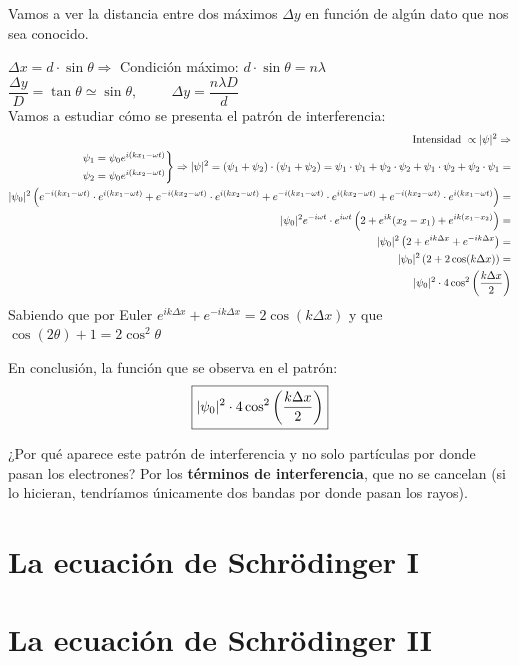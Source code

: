 \documentclass{report}
\begin{document}
    \noindent Vamos a ver la distancia entre dos máximos $\Delta y$ en función de algún dato
    que nos sea conocido.

    \noindent $\Delta x = d\cdot\sin\theta\Rightarrow$ Condición máximo: $\boxed{d\cdot\sin
    \theta=n\lambda}$ \hspace{1.5cm} $\dfrac{\Delta y}{D}=\tan\theta\simeq\sin\theta,\hspace{1cm}
    \boxed{\Delta y=\dfrac{n\lambda D}{d}}$\\

    \vspace{0.4cm}\noindent Vamos a estudiar cómo se presenta el patrón de interferencia:
    \begin{align}
      \begin{split}
        \text{Intensidad }\propto \lvert\psi\rvert^2\Rightarrow\\
        \begin{rcases}
          \psi_1=\psi_0e^{i(kx_1-\omega t)}\\
          \psi_2=\psi_0e^{i(kx_2-\omega t)}
        \end{rcases}
        \Rightarrow\lvert\psi\rvert^2=(\psi_1+\psi_2)\cdot(\psi_1+\psi_2)=\psi_1\cdot\psi_1+\psi_2\cdot
        \psi_2+\psi_1\cdot\psi_2+\psi_2\cdot\psi_1=\\ \lvert\psi_0\rvert^2\left(e^{-i(kx_1-\omega t)}\cdot
        e^{i(kx_1-\omega t)}+e^{-i(kx_2-\omega t)}\cdot e^{i(kx_2-\omega t)}+e^{-i(kx_1-\omega t)}
        \cdot e^{i(kx_2-\omega t)}+e^{-i(kx_2-\omega t)}\cdot e^{i(kx_1-\omega t)}\right)=\\ \lvert
        \psi_0\rvert^2e^{-i\omega t}\cdot e^{i\omega t}\left(2+e^{ik}(x_2-x_1)+e^{ik(x_1-x_2)}\right)=\\
        \lvert\psi_0\rvert^2\left(2+e^{ik\Delta x}+e^{-ik\Delta x}\right)=\\ \lvert\psi_0\rvert^2\left(
        2+2\cos(k\Delta x)\right)=\\ \lvert\psi_0\rvert^2\cdot 4\cos^2\left(\dfrac{k\Delta x}{2}\right)
      \end{split}
    \end{align}
    \noindent Sabiendo que por Euler $e^{ik\Delta x}+e^{-ik\Delta x}=2\cos(k\Delta x)$ y que 
    $\cos(2\theta)+1=2\cos^2\theta$

    \noindent En conclusión, la función que se observa en el patrón:
    \begin{equation}
      \boxed{\lvert\psi_0\rvert^2\cdot4\cos^2\left(\dfrac{k\Delta x}{2}\right)}
      \label{eq:PatronInterferencia}
    \end{equation}

    \noindent ¿Por qué aparece este patrón de interferencia y no solo partículas por donde pasan
    los electrones? Por los \textbf{términos de interferencia}, que no se cancelan (si lo 
    hicieran, tendríamos únicamente dos bandas por donde pasan los rayos).
\chapter{La ecuación de Schrödinger I}
\chapter{La ecuación de Schrödinger II}
\end{document}

